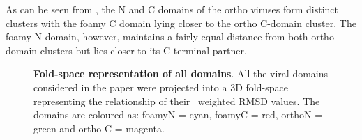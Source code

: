 As can be seen from , the N and C domains of the ortho viruses form distinct
clusters with the foamy C domain lying closer to the ortho C-domain cluster.   The foamy
N-domain, however, maintains a fairly equal distance from both ortho domain clusters but
lies closer to its C-terminal partner.

\begin{figure}
\centering
\epsfxsize=300pt 
\begin{footnotesize}
\caption{
\label{Fig:space}
{\bf Fold-space representation of all domains}.
All the viral domains considered in the paper were projected into a 3D fold-space representing
the relationship of their \SAP\ weighted RMSD values.   The domains are coloured as:
foamyN = cyan, foamyC = red, orthoN = green and ortho C = magenta. 
}
\end{footnotesize}
\end{figure}
